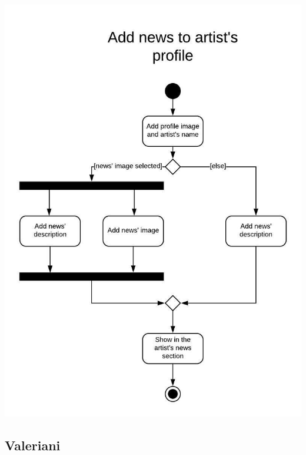 \documentclass[11pt,a4paper]{article}
\begin{document}
\includegraphics[scale=0.5]{addnews2.jpeg}
\subsection{Valeriani}
\end{document}
